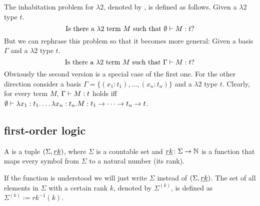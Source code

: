 \begin{definition}
The inhabitation problem for $\lambda2$, denoted by \lambdaInhab, is defined as follows. Given a $\lambda2$ type $t$.
\[\text{Is there a $\lambda2$ term $M$ such that } \emptyset\vdash M:t?\]
But we can rephrase this problem so that it becomes more general:
Given a basis $\Gamma$ and a $\lambda2$ type $t$.
\[\text{Is there a $\lambda2$ term $M$ such that } \Gamma\vdash M:t?\]
Obviously the second version is a special case of the first one. For the other direction consider a basis $\Gamma=\{(x_1:t_1),\dots,(x_n:t_n)\}$ and a $\lambda2$ type $t$. Clearly, for every term $M$, $\Gamma\vdash M:t$ holds iff $\emptyset\vdash \lambda x_1:t_1.\dots\lambda x_n:t_n.M:t_1\to\dots\to t_n\to t$.
\end{definition}
\subsection{first-order logic}
\begin{definition}
	A  is a tuple $(\Sigma,\emph{rk})$, where $\Sigma$ is a countable set and $\emph{rk}\colon\Sigma\to\mathbb{N}$ is a function that maps every symbol from $\Sigma$ to a natural number (its rank).
\end{definition}
If the function \rank{} is understood we will just write $\Sigma$ instead of $(\Sigma,\emph{rk})$. The set of all elements in $\Sigma$ with a certain rank $k$, denoted by $\Sigma^{(k)}$, is defined as $\Sigma^{(k)}:=rk^{-1}(k)$. 


